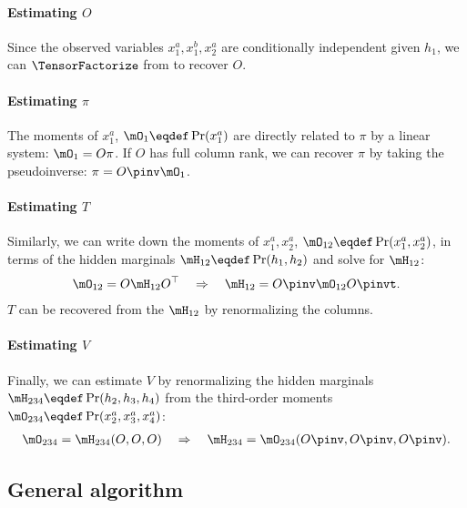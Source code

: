 \paragraph{Estimating $O$}
Since the observed variables $x^a_1, x^b_1, x^a_2$ are
  conditionally independent given $h_1$, we can $\TensorFactorize$ from
   to recover $O$.

\paragraph{Estimating $\pi$}
The moments of $x^a_1$, $\mO_1 \eqdef \Pr(x^a_1)$ are directly related to
  $\pi$ by a linear system: $\mO_1 = O \pi$. 
If $O$ has full column rank, we can recover $\pi$ by taking the pseudoinverse: $\pi = O\pinv  \mO_1$.

\paragraph{Estimating $T$}
Similarly, we can write down the moments of $x^a_1, x^a_2$, $\mO_{12}
  \eqdef \Pr(x^a_1, x^a_2)$, in terms of the hidden marginals $\mH_{12}
  \eqdef \Pr(h_1, h_2)$ and solve for $\mH_{12}$:
\begin{align*}
\mO_{12} = O \mH_{12} O^\top \quad\Rightarrow\quad
  \mH_{12} = O\pinv  \mO_{12} O\pinvt .
\end{align*}
$T$ can be recovered from the $\mH_{12}$ by renormalizing the columns.

\paragraph{Estimating $V$}
Finally, we can estimate $V$ by renormalizing the hidden marginals
$\mH_{234} \eqdef \Pr(h_2, h_3, h_4)$ from the third-order moments
$\mO_{234} \eqdef \Pr(x^a_2, x^a_3, x^a_4)$:
\begin{align*}
  \mO_{234} = \mH_{234}(O, O, O) \quad\Rightarrow\quad
  \mH_{234} = \mO_{234}(O\pinv , O\pinv , O\pinv ).
\end{align*}

\subsection{General algorithm}
\label{sec:directedGeneral}


